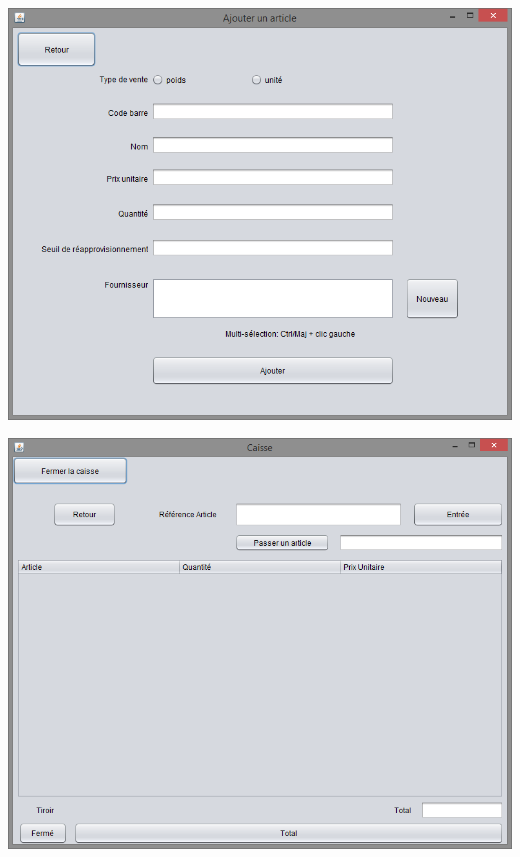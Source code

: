 \begin{center}
	\includegraphics[width=14cm]{./Implementation/ajouteraticle}
\end{center}

\begin{center}
	\includegraphics[width=14cm]{./Implementation/caisse}
\end{center}

